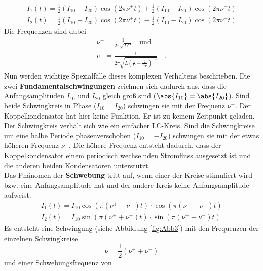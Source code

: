 \begin{align}
I_1(t) = \frac{1}{2}(I_{10} + I_{20}) \cos(2 \pi \nu^+ t) + \frac{1}{2}(I_{10} - I_{20}) \cos(2 \pi \nu^- t) \\
I_2(t) = \frac{1}{2}(I_{10} + I_{20}) \cos(2 \pi \nu^+ t) - \frac{1}{2}(I_{10} - I_{20}) \cos(2 \pi \nu^- t)
\end{align}
Die Frequenzen sind dabei
\begin{align}
\nu^+ = \frac{1}{2 \pi \sqrt{L C}} \quad \text{und} \label{Frequenz_p} \\
\nu^- = \frac{1}{2 \pi \sqrt{L\left(\frac{1}{C} + \frac{2}{C_\text{K}}\right)^{-1}}} \quad . \label{Frequenz_m}
\end{align}
Nun werden wichtige Spezialfälle dieses komplexen Verhaltens beschrieben. Die zwei \textbf{Fundamentalschwingungen} zeichnen sich dadurch aus, dass die Anfangsamplituden $I_{10}$ und $I_{20}$ gleich groß sind ($\abs{I_{10}} = \abs{I_{20}}$). Sind beide Schwingkreis in Phase ($I_{10}=I_{20}$) schwingen sie mit der Frequenz $\nu^+$. Der Koppelkondensator hat hier keine Funktion. Er ist zu keinem Zeitpunkt geladen. Der Schwingkreis verhält sich wie ein einfacher LC-Kreis. Sind die Schwingkreise um eine halbe Periode phasenverschoben ($I_{10} = - I_{20}$) schwingen sie mit der etwas höheren Frequenz $\nu^-$. Die höhere Frequenz entsteht dadurch, dass der Koppelkondensator einem periodisch wechselnden Stromfluss ausgesetzt ist und die anderen beiden Kondensatoren unterstützt. \\
Das Phänomen der \textbf{Schwebung} tritt auf, wenn einer der Kreise stimuliert wird bzw. eine Anfangsamplitude hat und der andere Kreis keine Anfangsamplitude aufweist.
\begin{align}\label{Schwebung}
	I_1(t) = I_{10}  \cos \left( \pi (\nu^+ + \nu^-) t \right) \cdot  \cos \left( \pi (\nu^+ - \nu^-) t \right) \\
	I_2 (t) = I_{10}  \sin \left( \pi (\nu^+ + \nu^-) t \right) \cdot  \sin \left( \pi (\nu^+ - \nu^-) t \right) 
\end{align}
Es entsteht eine Schwingung (siehe Abbildung \ref{fig:Abb3})  mit den Frequenzen der einzelnen Schwingkreise
\begin{equation}
	\nu = \frac{1}{2} (\nu^+ + \nu^-)
\end{equation}
und einer Schwebungsfrequenz von 
